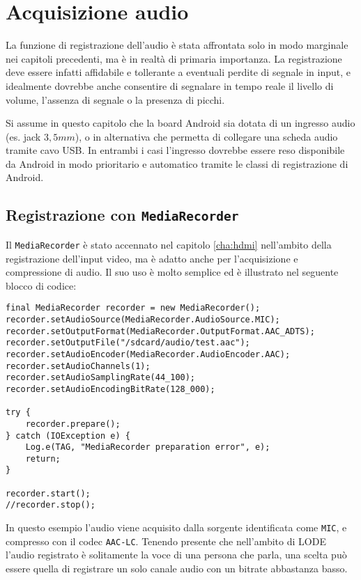 \chapter{Acquisizione audio}
\label{cha:audio}

La funzione di registrazione dell'audio è stata affrontata solo in modo marginale nei capitoli precedenti, ma è in realtà di primaria importanza. La registrazione deve essere infatti affidabile e tollerante a eventuali perdite di segnale in input, e idealmente dovrebbe anche consentire di segnalare in tempo reale il livello di volume, l'assenza di segnale o la presenza di picchi.

Si assume in questo capitolo che la board Android sia dotata di un ingresso audio (es. jack $3,5mm$), o in alternativa che permetta di collegare una scheda audio tramite cavo USB. In entrambi i casi l'ingresso dovrebbe essere reso disponibile da Android in modo prioritario e automatico tramite le classi di registrazione di Android.

\section{Registrazione con \texttt{MediaRecorder}}
\label{sec:audio_mediarecord}

Il \texttt{MediaRecorder} è stato accennato nel capitolo \ref{cha:hdmi} nell'ambito della registrazione dell'input video, ma è adatto anche per l'acquisizione e compressione di audio. Il suo uso è molto semplice ed è illustrato nel seguente blocco di codice:

\begin{verbatim}
final MediaRecorder recorder = new MediaRecorder();
recorder.setAudioSource(MediaRecorder.AudioSource.MIC);
recorder.setOutputFormat(MediaRecorder.OutputFormat.AAC_ADTS);
recorder.setOutputFile("/sdcard/audio/test.aac");
recorder.setAudioEncoder(MediaRecorder.AudioEncoder.AAC);
recorder.setAudioChannels(1);
recorder.setAudioSamplingRate(44_100);
recorder.setAudioEncodingBitRate(128_000);

try {
    recorder.prepare();
} catch (IOException e) {
    Log.e(TAG, "MediaRecorder preparation error", e);
    return;
}

recorder.start();
//recorder.stop();
\end{verbatim}

In questo esempio l'audio viene acquisito dalla sorgente identificata come \texttt{MIC}, e compresso con il codec \texttt{AAC-LC}.\footnotemark{} Tenendo presente che nell'ambito di LODE l'audio registrato è solitamente la voce di una persona che parla, una scelta può essere quella di registrare un solo canale audio con un bitrate abbastanza basso.

